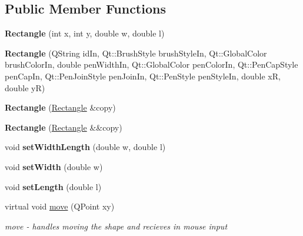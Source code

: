 \subsection*{Public Member Functions}
\begin{DoxyCompactItemize}
\item 
\mbox{\label{class_rectangle_a45ea4c7e76ce39d3a84104302469459c}} 
{\bfseries Rectangle} (int x, int y, double w, double l)
\item 
\mbox{\label{class_rectangle_ad2c25ea89c4241b8bce1d4f5968986cb}} 
{\bfseries Rectangle} (Q\+String id\+In, Qt\+::\+Brush\+Style brush\+Style\+In, Qt\+::\+Global\+Color brush\+Color\+In, double pen\+Width\+In, Qt\+::\+Global\+Color pen\+Color\+In, Qt\+::\+Pen\+Cap\+Style pen\+Cap\+In, Qt\+::\+Pen\+Join\+Style pen\+Join\+In, Qt\+::\+Pen\+Style pen\+Style\+In, double xR, double yR)
\item 
\mbox{\label{class_rectangle_a777b92b37ee95a1285bd7dddf8c61a40}} 
{\bfseries Rectangle} (\hyperlink{class_rectangle}{Rectangle} \&copy)
\item 
\mbox{\label{class_rectangle_a3237955de5a7ae91bb0f617bc245c55e}} 
{\bfseries Rectangle} (\hyperlink{class_rectangle}{Rectangle} \&\&copy)
\item 
\mbox{\label{class_rectangle_a248979d5af0684e056dcb4715f4b1e1e}} 
void {\bfseries set\+Width\+Length} (double w, double l)
\item 
\mbox{\label{class_rectangle_a73685e64359134d26b57886aca27c1e7}} 
void {\bfseries set\+Width} (double w)
\item 
\mbox{\label{class_rectangle_a4401ebc484718df223089cb442a2f813}} 
void {\bfseries set\+Length} (double l)
\item 
virtual void \hyperlink{class_rectangle_abeeafbc4d44bf241cf655e850f3ce3f3}{move} (Q\+Point xy)
\begin{DoxyCompactList}\small\item\em move -\/ handles moving the shape and recieves in mouse input \end{DoxyCompactList}\item 
\mbox{\label{class_rectangle_a9911b718370d9f9c987c1c5f85379b09}} 

\end{DoxyCompactItemize}
